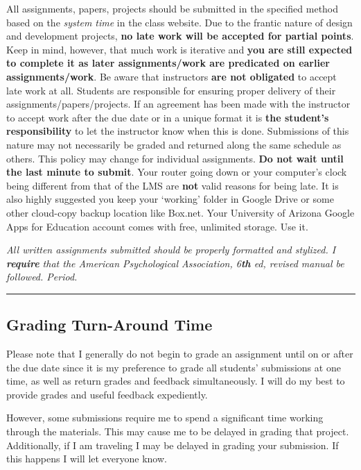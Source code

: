 \documentclass[]{article}
\begin{document}
All assignments, papers, projects should be submitted in the specified
method based on the \emph{system time} in the class website. Due to the
frantic nature of design and development projects, \textbf{no late work
will be accepted for partial points}. Keep in mind, however, that much
work is iterative and \textbf{you are still expected to complete it as
later assignments/work are predicated on earlier assignments/work}. Be
aware that instructors \textbf{are not obligated} to accept late work at
all. Students are responsible for ensuring proper delivery of their
assignments/papers/projects. If an agreement has been made with the
instructor to accept work after the due date or in a unique format it is
\textbf{the student's responsibility} to let the instructor know when
this is done. Submissions of this nature may not necessarily be graded
and returned along the same schedule as others. This policy may change
for individual assignments. \textbf{Do not wait until the last minute to
submit}. Your router going down or your computer's clock being different
from that of the LMS are \textbf{not} valid reasons for being late. It
is also highly suggested you keep your `working' folder in Google Drive
or some other cloud-copy backup location like Box.net. Your University
of Arizona Google Apps for Education account comes with free, unlimited
storage. Use it.

\emph{All written assignments submitted should be properly formatted and
stylized. I \textbf{\emph{require}} that the American Psychological
Association, 6\textbf{th} ed, revised manual be followed. Period.}

\begin{center}\rule{0.5\linewidth}{\linethickness}\end{center}

\hypertarget{grading-turn-around-time}{%
\subsection{Grading Turn-Around Time}\label{grading-turn-around-time}}

Please note that I generally do not begin to grade an assignment until
on or after the due date since it is my preference to grade all
students' submissions at one time, as well as return grades and feedback
simultaneously. I will do my best to provide grades and useful feedback
expediently.

However, some submissions require me to spend a significant time working
through the materials. This may cause me to be delayed in grading that
project. Additionally, if I am traveling I may be delayed in grading
your submission. If this happens I will let everyone know.
\end{document}
